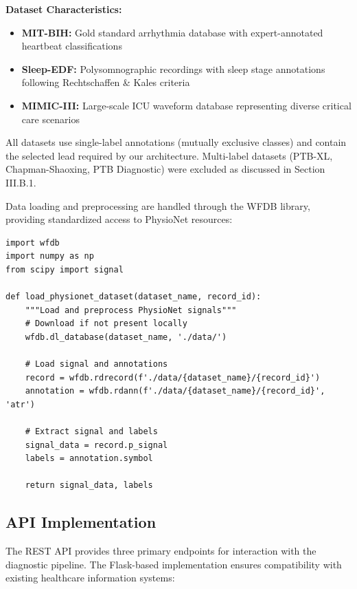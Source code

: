 \documentclass[conference]{IEEEtran}
\begin{document}
\textbf{Dataset Characteristics:}
\begin{itemize}
\item \textbf{MIT-BIH:} Gold standard arrhythmia database with expert-annotated heartbeat classifications
\item \textbf{Sleep-EDF:} Polysomnographic recordings with sleep stage annotations following Rechtschaffen \& Kales criteria
\item \textbf{MIMIC-III:} Large-scale ICU waveform database representing diverse critical care scenarios
\end{itemize}

All datasets use single-label annotations (mutually exclusive classes) and contain the selected lead required by our architecture. Multi-label datasets (PTB-XL, Chapman-Shaoxing, PTB Diagnostic) were excluded as discussed in Section III.B.1.

Data loading and preprocessing are handled through the WFDB library, providing standardized access to PhysioNet resources:

\begin{lstlisting}[caption={PhysioNet data loading implementation},label={lst:wfdb}]
import wfdb
import numpy as np
from scipy import signal

def load_physionet_dataset(dataset_name, record_id):
    """Load and preprocess PhysioNet signals"""
    # Download if not present locally
    wfdb.dl_database(dataset_name, './data/')
    
    # Load signal and annotations
    record = wfdb.rdrecord(f'./data/{dataset_name}/{record_id}')
    annotation = wfdb.rdann(f'./data/{dataset_name}/{record_id}', 'atr')
    
    # Extract signal and labels
    signal_data = record.p_signal
    labels = annotation.symbol
    
    return signal_data, labels
\end{lstlisting}

\subsection{API Implementation}

The REST API provides three primary endpoints for interaction with the diagnostic pipeline. The Flask-based implementation ensures compatibility with existing healthcare information systems:
\end{document}
